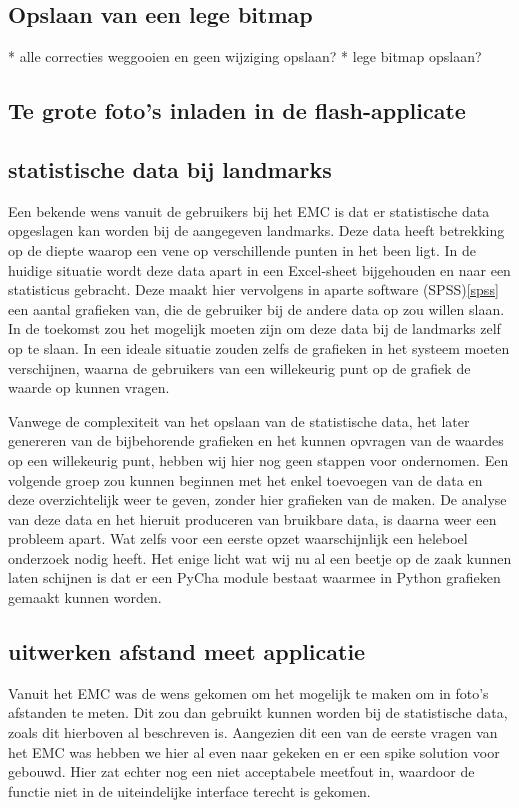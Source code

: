 \subsection{Opslaan van een lege bitmap}
* alle correcties weggooien en geen wijziging opslaan?
* lege bitmap opslaan?

\subsection{Te grote foto's inladen in de flash-applicate}

\subsection{statistische data bij landmarks}
Een bekende wens vanuit de gebruikers bij het EMC is dat er statistische data opgeslagen kan worden bij de aangegeven landmarks.
Deze data heeft betrekking op de diepte waarop een vene op verschillende punten in het been ligt.
In de huidige situatie wordt deze data apart in een Excel-sheet bijgehouden en naar een statisticus gebracht.
Deze maakt hier vervolgens in aparte software (SPSS)\ref{spss} een aantal grafieken van, die de gebruiker bij de andere data op zou willen slaan.
In de toekomst zou het mogelijk moeten zijn om deze data bij de landmarks zelf op te slaan.
In een ideale situatie zouden zelfs de grafieken in het systeem moeten verschijnen, waarna de gebruikers van een willekeurig punt op de grafiek de waarde op kunnen vragen.

Vanwege de complexiteit van het opslaan van de statistische data, het later genereren van de bijbehorende grafieken en het kunnen opvragen van de waardes op een willekeurig punt, hebben wij hier nog geen stappen voor ondernomen.
Een volgende groep zou kunnen beginnen met het enkel toevoegen van de data en deze overzichtelijk weer te geven, zonder hier grafieken van de maken.
De analyse van deze data en het hieruit produceren van bruikbare data, is daarna weer een probleem apart.
Wat zelfs voor een eerste opzet waarschijnlijk een heleboel onderzoek nodig heeft.
Het enige licht wat wij nu al een beetje op de zaak kunnen laten schijnen is dat er een PyCha module bestaat waarmee in Python grafieken gemaakt kunnen worden.

\subsection{uitwerken afstand meet applicatie}
Vanuit het EMC was de wens gekomen om het mogelijk te maken om in foto's afstanden te meten.
Dit zou dan gebruikt kunnen worden bij de statistische data, zoals dit hierboven al beschreven is.
Aangezien dit een van de eerste vragen van het EMC was hebben we hier al even naar gekeken en er een spike solution voor gebouwd.
Hier zat echter nog een niet acceptabele meetfout in, waardoor de functie niet in de uiteindelijke interface terecht is gekomen.

